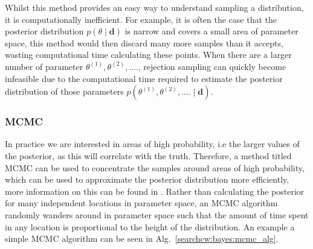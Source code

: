 Whilst this method provides an easy way to understand sampling a distribution, it is computationally inefficient. For example, it is often the case that the posterior distribution $p(\theta \mid \bm{d})$ is narrow and covers a small area of parameter space, this method would then discard many more samples than it accepts, wasting computational time calculating these points. 
When there are a larger number of parameter $\theta^{(1)},\theta^{(2)}, ....$, rejection sampling can quickly become infeasible due to the computational time required to estimate the posterior distribution of those parameters $p(\theta^{(1)},\theta^{(2)}, .... \mid \bm{d})$.

%
\subsubsection{MCMC}
%

In practice we are interested in areas of high probability, i.e the larger values of the posterior, as this will correlate with the truth.
Therefore, a method titled \gls{MCMC} can be used to concentrate the samples around areas of high probability, which
can be used to approximate the posterior distribution more
efficiently, more information on this can be found in
\citep{metropolis1953EquationState,vanravenzwaaij2018SimpleIntroduction,sharma2017MarkovChain}.
Rather than calculating the posterior for many independent locations in parameter space, an \gls{MCMC} algorithm randomly wanders around in parameter space such that the amount of time spent in any location is proportional to the height of the distribution.
An example a simple \gls{MCMC} algorithm can be seen in Alg.~\ref{searchcw:bayes:mcmc_alg}.

